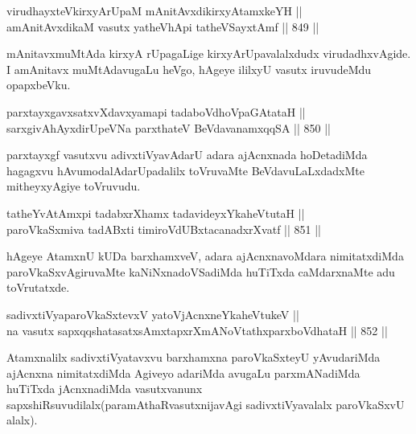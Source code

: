 
\begin{shl}
virudhayxteV\s kirxyArUpaM mAnitAvxdikirxyAtamxkeYH || \\
amAnitAvxdikaM vasutx yatheVhApi tatheVSayxtAmf \hfill || 849 ||  
\end{shl}

\begin{artha}
mAnitavxmuMtAda kirxyA rUpagaLige kirxyArUpavalalxdudx virudadhxvAgide. I amAnitavx muMtAdavugaLu heVgo, hAgeye ililxyU vasutx iruvudeMdu opapxbeVku.
\end{artha}

\begin{shl}
parxtayxgavxsatxvXdavxyamapi tadaboVdhoVpaGAtataH || \\
sarxgivAhAyxdirUpeVNa parxthateV BeVdavanamxqqSA \hfill || 850 ||  
\end{shl}

\begin{artha}
parxtayxgf vasutxvu adivxtiVyavAdarU adara ajAcnxnada hoDetadiMda hagagxvu hAvumodalAdarUpadalilx toVruvaMte BeVdavuLaLxdadxMte mitheyxyAgiye toVruvudu.
\end{artha}

\begin{shl}
tatheYvA\s \s tAmx\s pi tadabxrXhamx tadavideyxYkaheVtutaH || \\
paroVkaSxmiva tadABxti timiroVdUBxtacanadxrXvatf \hfill || 851 ||  
\end{shl}

\begin{artha}
hAgeye AtamxnU kUDa barxhamxveV, adara ajAcnxnavoMdara nimitatxdiMda paroVkaSxvAgiruvaMte kaNiNxnadoVSadiMda huTiTxda caMdarxnaMte adu toVrutatxde.
\end{artha}

\begin{shl}
sadivxtiVyaparoVkaSxtevxV yatoV\s jAcnxneYkaheVtukeV || \\
na vasutx sapxqqshatasatxsAmxtapxrXmANoVtathxparxboVdhataH \hfill || 852 ||  
\end{shl}

\begin{artha}
Atamxnalilx sadivxtiVyatavxvu barxhamxna paroVkaSxteyU yAvudariMda ajAcnxna nimitatxdiMda Agiveyo adariMda avugaLu parxmANadiMda huTiTxda jAcnxnadiMda vasutxvanunx sapxshiRsuvudilalx(paramAthaRvasutxnijavAgi sadivxtiVyavalalx paroVkaSxvU alalx).
\end{artha}

